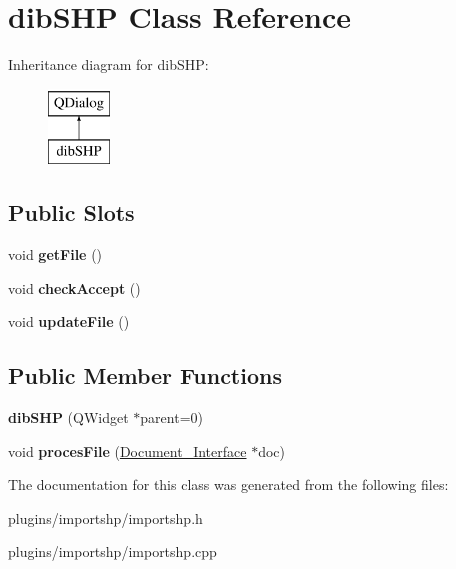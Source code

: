 \hypertarget{classdibSHP}{\section{dib\-S\-H\-P Class Reference}
\label{classdibSHP}
}
Inheritance diagram for dib\-S\-H\-P\-:\begin{figure}[H]
\begin{center}
\leavevmode
\includegraphics[height=2.000000cm]{classdibSHP}
\end{center}
\end{figure}
\subsection*{Public Slots}
\begin{DoxyCompactItemize}
\item 
\hypertarget{classdibSHP_a193a5a03af383cc3186cf0deb8416ae8}{void {\bfseries get\-File} ()}\label{classdibSHP_a193a5a03af383cc3186cf0deb8416ae8}

\item 
\hypertarget{classdibSHP_a7b6e92e47a61cc576268e4ed8176c975}{void {\bfseries check\-Accept} ()}\label{classdibSHP_a7b6e92e47a61cc576268e4ed8176c975}

\item 
\hypertarget{classdibSHP_a260850500f20ec5d89fdd04b1f00a09e}{void {\bfseries update\-File} ()}\label{classdibSHP_a260850500f20ec5d89fdd04b1f00a09e}

\end{DoxyCompactItemize}
\subsection*{Public Member Functions}
\begin{DoxyCompactItemize}
\item 
\hypertarget{classdibSHP_a8e2d90afd65f9df702b0eec8f7f197f6}{{\bfseries dib\-S\-H\-P} (Q\-Widget $\ast$parent=0)}\label{classdibSHP_a8e2d90afd65f9df702b0eec8f7f197f6}

\item 
\hypertarget{classdibSHP_a76aaf8799668d9e1327e084954d71d8f}{void {\bfseries proces\-File} (\hyperlink{classDocument__Interface}{Document\-\_\-\-Interface} $\ast$doc)}\label{classdibSHP_a76aaf8799668d9e1327e084954d71d8f}

\end{DoxyCompactItemize}


The documentation for this class was generated from the following files\-:\begin{DoxyCompactItemize}
\item 
plugins/importshp/importshp.\-h\item 
plugins/importshp/importshp.\-cpp\end{DoxyCompactItemize}
